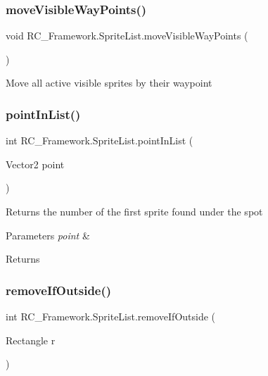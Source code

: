 \subsubsection{\texorpdfstring{move\+Visible\+Way\+Points()}{moveVisibleWayPoints()}}
{\footnotesize\ttfamily void R\+C\+\_\+\+Framework.\+Sprite\+List.\+move\+Visible\+Way\+Points (\begin{DoxyParamCaption}{ }\end{DoxyParamCaption})}



Move all active visible sprites by their waypoint 

\mbox{\label{class_r_c___framework_1_1_sprite_list_a06ea4d7accd25d0fb593bcf043bb16b5}} 
\subsubsection{\texorpdfstring{point\+In\+List()}{pointInList()}}
{\footnotesize\ttfamily int R\+C\+\_\+\+Framework.\+Sprite\+List.\+point\+In\+List (\begin{DoxyParamCaption}\item[{Vector2}]{point }\end{DoxyParamCaption})}



Returns the number of the first sprite found \textquotesingle{}under\textquotesingle{} the spot 


\begin{DoxyParams}{Parameters}
{\em point} & \\
\hline
\end{DoxyParams}
\begin{DoxyReturn}{Returns}

\end{DoxyReturn}
\mbox{\label{class_r_c___framework_1_1_sprite_list_a993e1c122878810e0e4cb439bc34be45}} 
\subsubsection{\texorpdfstring{remove\+If\+Outside()}{removeIfOutside()}}
{\footnotesize\ttfamily int R\+C\+\_\+\+Framework.\+Sprite\+List.\+remove\+If\+Outside (\begin{DoxyParamCaption}\item[{Rectangle}]{r }\end{DoxyParamCaption})}



